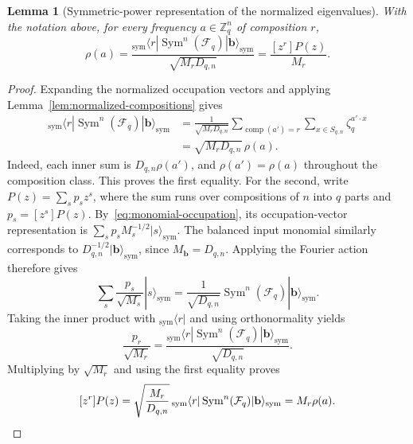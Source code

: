 \documentclass[11pt,a4paper]{article}
\numberwithin{equation}{section}
\numberwithin{figure}{section}
\numberwithin{table}{section}
\numberwithin{footnote}{section}
\newtheorem{lemma}[theorem]{Lemma}
\theoremstyle{informal}\newtheorem*{informaltheorem}{Informal theorem}
\theoremstyle{definition}\newtheorem{example}{Example}[section]
\theoremstyle{remark}\newtheorem{remark}[theorem]{Remark}
\newcommand{\Z}{\mathbb Z}
\begin{document}
\begin{lemma}[Symmetric-power representation of the normalized eigenvalues]
\label{lem:symmetric-fourier}
With the notation above, for every frequency \(a\in\Z_q^n\) of
composition \(r\),
\begin{equation}\label{eq:symmetric-fourier-eigenvalue}
 \rho(a)=
 \frac{{}_{\mathrm{sym}}\langle r|
       \operatorname{Sym}^n(\mathcal F_q)
       |\mathbf b\rangle_{\mathrm{sym}}}
      {\sqrt{M_rD_{q,n}}}
 =\frac{[z^r]P(z)}{M_r}.
\end{equation}
\end{lemma}
\begin{proof}
Expanding the normalized occupation vectors and applying
Lemma~\ref{lem:normalized-compositions} gives
\begin{equation}
 \begin{aligned}
 {}_{\mathrm{sym}}\langle r|
       \operatorname{Sym}^n(\mathcal F_q)
       |\mathbf b\rangle_{\mathrm{sym}}
 &=\frac1{\sqrt{M_rD_{q,n}}}
   \sum_{\operatorname{comp}(a')=r}\sum_{x\in S_{q,n}}
          \zeta_q^{a'\cdot x}\\
 &=\sqrt{M_rD_{q,n}}\,\rho(a).
 \end{aligned}
\end{equation}
Indeed, each inner sum is \(D_{q,n}\rho(a')\), and
\(\rho(a')=\rho(a)\) throughout the composition class.
This proves the first equality. For the second, write
\(P(z)=\sum_s p_s z^s\), where the sum runs over compositions
of \(n\) into \(q\) parts and \(p_s=[z^s]P(z)\).
By~\eqref{eq:monomial-occupation}, its occupation-vector representation
is \(\sum_s p_s M_s^{-1/2}|s\rangle_{\mathrm{sym}}\).
The balanced input monomial similarly corresponds to
\(D_{q,n}^{-1/2}|\mathbf b\rangle_{\mathrm{sym}}\), since
\(M_{\mathbf b}=D_{q,n}\). Applying the Fourier action therefore gives
\begin{equation}
 \sum_s\frac{p_s}{\sqrt{M_s}}|s\rangle_{\mathrm{sym}}
 =\frac1{\sqrt{D_{q,n}}}
       \operatorname{Sym}^n(\mathcal F_q)
       |\mathbf b\rangle_{\mathrm{sym}}.
\end{equation}
Taking the inner product with \({}_{\mathrm{sym}}\langle r|\)
and using orthonormality yields
\begin{equation}
 \frac{p_r}{\sqrt{M_r}}
 =\frac{{}_{\mathrm{sym}}\langle r|
       \operatorname{Sym}^n(\mathcal F_q)
       |\mathbf b\rangle_{\mathrm{sym}}}{\sqrt{D_{q,n}}}.
\end{equation}
Multiplying by \(\sqrt{M_r}\) and using the first equality proves
\begin{equation}\label{eq:phase-coefficient-sum}
 [z^r]P(z)
 =\sqrt{\frac{M_r}{D_{q,n}}}\,
       {}_{\mathrm{sym}}\langle r|
       \operatorname{Sym}^n(\mathcal F_q)
       |\mathbf b\rangle_{\mathrm{sym}}
 =M_r\rho(a).\qedhere
\end{equation}
\end{proof}
\end{document}
